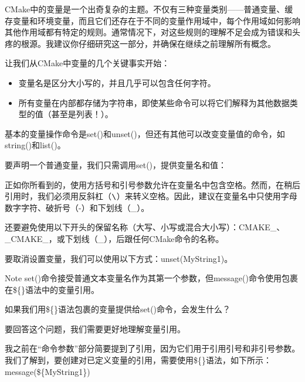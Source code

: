 
CMake中的变量是一个出奇复杂的主题。不仅有三种变量类别——普通变量、缓存变量和环境变量，而且它们还存在于不同的变量作用域中，每个作用域如何影响其他作用域都有特定的规则。通常情况下，对这些规则的理解不足会成为错误和头疼的根源。我建议你仔细研究这一部分，并确保在继续之前理解所有概念。

让我们从CMake中变量的几个关键事实开始：

\begin{itemize}
\item
变量名是区分大小写的，并且几乎可以包含任何字符。

\item
所有变量在内部都存储为字符串，即使某些命令可以将它们解释为其他数据类型的值（甚至是列表！）。
\end{itemize}

基本的变量操作命令是set()和unset()，但还有其他可以改变变量值的命令，如string()和list()。

要声明一个普通变量，我们只需调用set()，提供变量名和值：



正如你所看到的，使用方括号和引号参数允许在变量名中包含空格。然而，在稍后引用时，我们必须用反斜杠（$ \verb|\|$）来转义空格。因此，建议在变量名中只使用字母数字字符、破折号（-）和下划线（\_）。

还要避免使用以下开头的保留名称（大写、小写或混合大小写）：CMAKE\_、\_CMAKE\_，或下划线（\_），后跟任何CMake命令的名称。

要取消设置变量，我们可以使用以下方式：unset(MyString1)。

\begin{myNotic}{Note}
set()命令接受普通文本变量名作为其第一个参数，但message()命令使用包裹在\$\{\}语法中的变量引用。
\end{myNotic}

如果我们用\$\{\}语法包裹的变量提供给set()命令，会发生什么？

要回答这个问题，我们需要更好地理解变量引用。


我之前在“命令参数”部分简要提到了引用，因为它们用于引用引号和非引号参数。我们了解到，要创建对已定义变量的引用，需要使用\$\{\}语法，如下所示：message(\$\{MyString1\})

